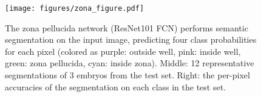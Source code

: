 \begin{figure}
\texttt{[image: figures/zona\_figure.pdf]}
\caption{
    The zona pellucida network (ResNet101 FCN) performs semantic segmentation
    on the input image, predicting four class probabilities for each
    pixel (colored as purple: outside well, pink: inside well, green:
    zona pellucida, cyan: inside zona). Middle: 12 representative
    segmentations of 3 embryos from the test set. Right: the per-pixel
    accuracies of the segmentation on each class in the test set.
}
\label{fig:zona}
\end{figure}

